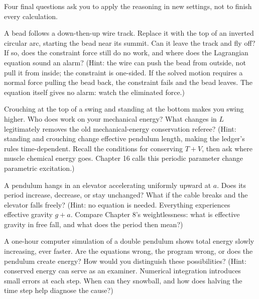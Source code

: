 \begin{mainline}
Four final questions ask you to apply the reasoning in new settings, not to finish every calculation.
\end{mainline}

\begin{puzzles}
\item A bead follows a down-then-up wire track. Replace it with the top of an inverted circular arc, starting the bead near its summit. Can it leave the track and fly off? If so, does the constraint force still do no work, and where does the Lagrangian equation sound an alarm? (Hint: the wire can push the bead from outside, not pull it from inside; the constraint is one-sided. If the solved motion requires a normal force pulling the bead back, the constraint fails and the bead leaves. The equation itself gives no alarm: watch the eliminated force.)
\item Crouching at the top of a swing and standing at the bottom makes you swing higher. Who does work on your mechanical energy? What changes in \(L\) legitimately removes the old mechanical-energy conservation referee? (Hint: standing and crouching change effective pendulum length, making the ledger's rules time-dependent. Recall the conditions for conserving \(T+V\), then ask where muscle chemical energy goes. Chapter 16 calls this periodic parameter change parametric excitation.)
\item A pendulum hangs in an elevator accelerating uniformly upward at \(a\). Does its period increase, decrease, or stay unchanged? What if the cable breaks and the elevator falls freely? (Hint: no equation is needed. Everything experiences effective gravity \(g+a\). Compare Chapter 8's weightlessness: what is effective gravity in free fall, and what does the period then mean?)
\item A one-hour computer simulation of a double pendulum shows total energy slowly increasing, ever faster. Are the equations wrong, the program wrong, or does the pendulum create energy? How would you distinguish these possibilities? (Hint: conserved energy can serve as an examiner. Numerical integration introduces small errors at each step. When can they snowball, and how does halving the time step help diagnose the cause?)
\end{puzzles}
